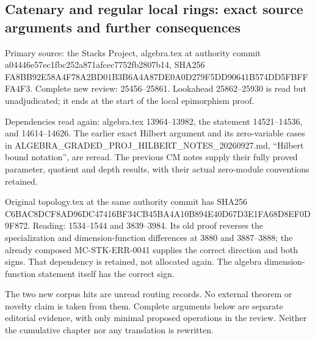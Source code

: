 \subsection{Catenary and regular local rings: exact source arguments and further consequences}\label{algebra-proof-020-catenary-and-regular-local-rings-exact-source-arguments-and-further-consequences}

Primary source: the Stacks Project, algebra.tex at authority commit a044\allowbreak{}46e5\allowbreak{}7ec1\allowbreak{}fbc2\allowbreak{}52a8\allowbreak{}71af\allowbreak{}cec7\allowbreak{}752f\allowbreak{}b280\allowbreak{}7b14, SHA256 FA8B\allowbreak{}B92E\allowbreak{}58A4\allowbreak{}F78A\allowbreak{}2BD0\allowbreak{}1B3B\allowbreak{}6A4A\allowbreak{}87DE\allowbreak{}0A0D\allowbreak{}279F\allowbreak{}5DD9\allowbreak{}0641\allowbreak{}B574\allowbreak{}DD5F\allowbreak{}BFFF\allowbreak{}A4F3. Complete new review: 25456--25861. Lookahead 25862--25930 is read but unadjudicated; it ends at the start of the local epimorphism proof.

Dependencies read again: algebra.tex 13964--13982, the statement 14521--14536, and 14614--14626. The earlier exact Hilbert argument and its zero-variable cases in ALGEBRA\_\allowbreak{}GRADED\_\allowbreak{}PROJ\_\allowbreak{}HILBERT\_\allowbreak{}NOTES\_\allowbreak{}20260927.\allowbreak{}md, ``Hilbert bound notation'', are reread. The previous CM notes supply their fully proved parameter, quotient and depth results, with their actual zero-module conventions retained.

Original topology.tex at the same authority commit has SHA256 C6BA\allowbreak{}C8DC\allowbreak{}F8AD\allowbreak{}96DC\allowbreak{}4741\allowbreak{}6BF3\allowbreak{}4CB4\allowbreak{}5BA4\allowbreak{}A10B\allowbreak{}894E\allowbreak{}40D6\allowbreak{}7D3E\allowbreak{}1FA6\allowbreak{}8D8E\allowbreak{}F0D9\allowbreak{}F872. Reading: 1534--1544 and 3839--3984. Its old proof reverses the specialization and dimension-function differences at 3880 and 3887--3888; the already composed MC-STK-ERR-0041 supplies the correct direction and both signs. That dependency is retained, not allocated again. The algebra dimension-function statement itself has the correct sign.

The two new corpus hits are unread routing records. No external theorem or novelty claim is taken from them. Complete arguments below are separate editorial evidence, with only minimal proposed operations in the review. Neither the cumulative chapter nor any translation is rewritten.

